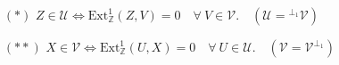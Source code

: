 \documentclass[preview]{standalone}
\begin{document}
\begin{center}
\begin{itemize} \item[$(\ast)$] $Z\in\mathcal{U} \Leftrightarrow \text{Ext}^1_\mathbb{Z}(Z,V)=0 \quad \forall \ V\in\mathcal{V}. \quad (\mathcal{U} = {}^{\perp_1}\mathcal{V})$ \item[$(\ast\ast)$] $X\in\mathcal{V} \Leftrightarrow \text{Ext}^1_\mathbb{Z}(U,X)=0 \quad \forall \ U\in\mathcal{U}. \quad (\mathcal{V} = \mathcal{V}^{\perp_1})$ \end{itemize}
\end{center}
\end{document}
